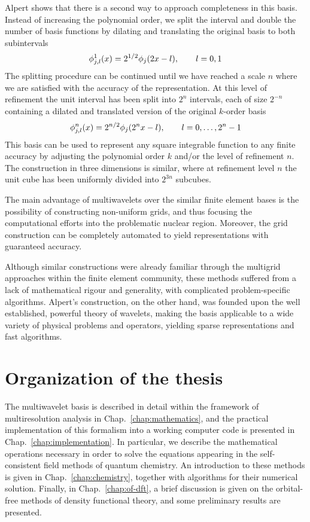 Alpert shows that there is a second way to approach completeness in this basis.
Instead of increasing the polynomial order, we split the interval and double 
the number of basis functions by dilating and translating the original basis 
to both subintervals
\begin{equation}
    \phi_{j,l}^1(x) = 2^{1/2}\phi_j(2x - l), \qquad l = 0,1
\end{equation}
The splitting procedure can be continued until we have reached a scale $n$ where 
we are satisfied with the accuracy of the representation. At this level of 
refinement the unit interval has been split into $2^n$ intervals, each of size 
$2^{-n}$ containing a dilated and translated version of the original $k$-order basis
\begin{equation}
    \phi_{j,l}^n(x) = 2^{n/2}\phi_j(2^nx - l), \qquad l = 0,\dots,2^n-1
\end{equation}
This basis can be used to represent any square integrable function to any finite 
accuracy by adjusting the polynomial order $k$ and/or the level of refinement $n$. 
The construction in three dimensions is similar, where at refinement level $n$
the unit cube has been uniformly divided into $2^{3n}$ subcubes. 

The main advantage of multiwavelets over the similar finite element bases is the
possibility of constructing non-uniform grids, and thus focusing the computational
efforts into the problematic nuclear region. Moreover, the grid construction can 
be completely automated to yield representations with guaranteed accuracy.

Although similar constructions were already familiar through the multigrid approaches 
within the finite element community, these methods suffered from a lack of mathematical
rigour and generality, with complicated problem-specific algorithms. Alpert's construction, 
on the other hand, was founded upon the well established, powerful theory of wavelets, 
making the basis applicable to a wide variety of physical problems and operators,
yielding sparse representations and fast algorithms.

\section{Organization of the thesis}
The multiwavelet basis is described in detail within the framework of multiresolution 
analysis in Chap.~\ref{chap:mathematics}, and the practical implementation of this 
formalism into a working computer code is presented in Chap.~\ref{chap:implementation}. 
In particular, we describe the mathematical operations necessary in order to solve the 
equations appearing in the self-consistent field methods of quantum chemistry. An 
introduction to these methods is given in Chap.~\ref{chap:chemistry}, together with 
algorithms for their numerical solution. Finally, in Chap.~\ref{chap:of-dft}, a brief 
discussion is given on the orbital-free methods of density functional theory, and
some preliminary results are presented.

